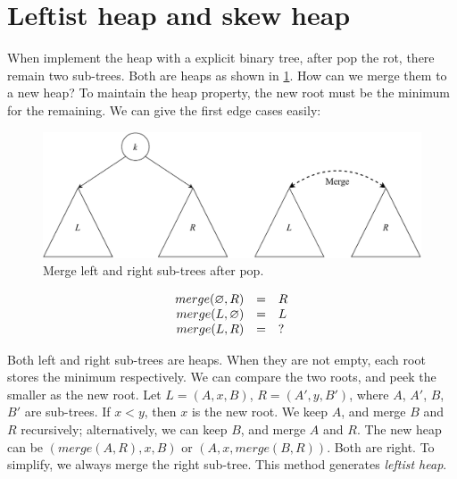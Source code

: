 \documentclass[b5paper]{article}
\begin{document}
\begin{Answer}[ref = {ex:arrayed-binary-heap}]

\end{Answer}

\section{Leftist heap and skew heap}
\label{ebheap}

When implement the heap with a explicit binary tree, after pop the rot, there remain two sub-trees. Both are heaps as shown in \cref{fig:lvr}. How can we merge them to a new heap? To maintain the heap property, the new root must be the minimum for the remaining. We can give the first edge cases easily:

\begin{figure}[htbp]
  \centering
  \includegraphics[scale=0.5]{img/lkr}
  \caption{Merge left and right sub-trees after pop.}
  \label{fig:lvr}
\end{figure}

\[
\begin{array}{rcl}
merge(\varnothing, R) & = & R \\
merge(L, \varnothing) & = & L \\
merge(L, R) & = & ? \\
\end{array}
\]

Both left and right sub-trees are heaps. When they are not empty, each root stores the minimum respectively. We can compare the two roots, and peek the smaller as the new root. Let $L = (A, x, B)$, $R = (A', y, B')$, where $A$, $A'$, $B$, $B'$ are sub-trees. If $x < y$, then $x$ is the new root. We keep $A$, and merge $B$ and $R$ recursively; alternatively, we can keep $B$, and merge $A$ and $R$. The new heap can be $(merge(A, R), x, B)$ or $(A, x, merge(B, R))$. Both are right. To simplify, we always merge the right sub-tree. This method generates {\em leftist heap}.
\end{document}
